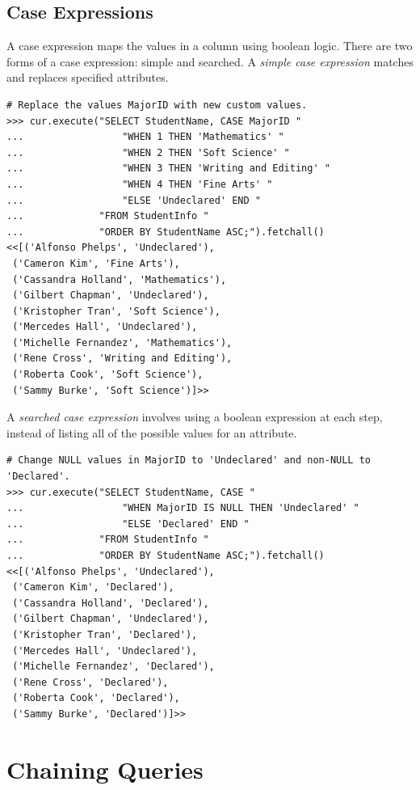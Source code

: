 \subsection*{Case Expressions} %

A case expression maps the values in a column using boolean logic.
There are two forms of a case expression: simple and searched.
A \emph{simple case expression} matches and replaces specified attributes.

\begin{lstlisting}
# Replace the values MajorID with new custom values.
>>> cur.execute("SELECT StudentName, CASE MajorID "
...                 "WHEN 1 THEN 'Mathematics' "
...                 "WHEN 2 THEN 'Soft Science' "
...                 "WHEN 3 THEN 'Writing and Editing' "
...                 "WHEN 4 THEN 'Fine Arts' "
...                 "ELSE 'Undeclared' END "
...             "FROM StudentInfo "
...             "ORDER BY StudentName ASC;").fetchall()
<<[('Alfonso Phelps', 'Undeclared'),
 ('Cameron Kim', 'Fine Arts'),
 ('Cassandra Holland', 'Mathematics'),
 ('Gilbert Chapman', 'Undeclared'),
 ('Kristopher Tran', 'Soft Science'),
 ('Mercedes Hall', 'Undeclared'),
 ('Michelle Fernandez', 'Mathematics'),
 ('Rene Cross', 'Writing and Editing'),
 ('Roberta Cook', 'Soft Science'),
 ('Sammy Burke', 'Soft Science')]>>
\end{lstlisting}

A \emph{searched case expression} involves using a boolean expression at each step, instead of listing all of the possible values for an attribute.

\begin{lstlisting}
# Change NULL values in MajorID to 'Undeclared' and non-NULL to 'Declared'.
>>> cur.execute("SELECT StudentName, CASE "
...                 "WHEN MajorID IS NULL THEN 'Undeclared' "
...                 "ELSE 'Declared' END "
...             "FROM StudentInfo "
...             "ORDER BY StudentName ASC;").fetchall()
<<[('Alfonso Phelps', 'Undeclared'),
 ('Cameron Kim', 'Declared'),
 ('Cassandra Holland', 'Declared'),
 ('Gilbert Chapman', 'Undeclared'),
 ('Kristopher Tran', 'Declared'),
 ('Mercedes Hall', 'Undeclared'),
 ('Michelle Fernandez', 'Declared'),
 ('Rene Cross', 'Declared'),
 ('Roberta Cook', 'Declared'),
 ('Sammy Burke', 'Declared')]>>
\end{lstlisting}

\section*{Chaining Queries} %

